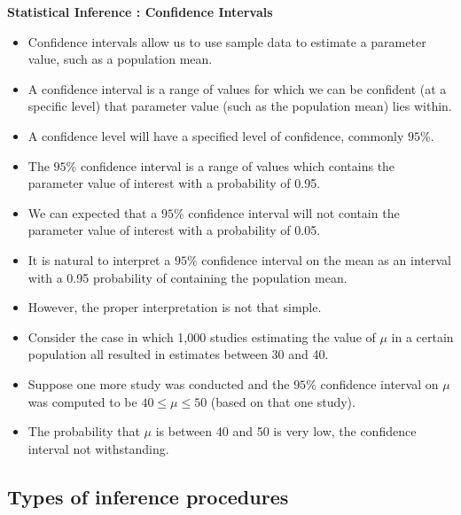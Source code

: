 \documentclass[]{report}
\begin{document}
\textbf{Statistical Inference : Confidence Intervals}
\begin{itemize}
\item Confidence intervals allow us to use sample data to estimate a parameter value, such as a population mean.
\item A confidence interval is a range of values for which we can be confident (at a specific level) that parameter value (such as the population mean)  lies within.
\item A confidence level will have a specified level of confidence, commonly $95\%$.
\item The $95\%$ confidence interval is a range of values which contains the parameter value of interest with a probability of 0.95.
\item We can expected that a $95\%$ confidence interval will not contain the parameter value of interest with a probability of 0.05.
\end{itemize}



\begin{itemize}

\item It is natural to interpret a $95\%$ confidence interval on the mean as an interval with a 0.95 probability of containing the population mean.
\item However, the proper interpretation is not that simple.
\item Consider the case in which 1,000 studies estimating the value of $\mu$  in a certain population all resulted
in estimates between 30 and 40.
\item Suppose one more study was conducted and the $95\%$ confidence interval on $\mu$ was computed
to be $40 \leq \mu \leq 50$ (based on that one study).

\item The probability that $\mu$ is between 40 and 50 is very low, the confidence interval not withstanding.

\end{itemize}


\subsection{Types of inference procedures}
\end{document}
